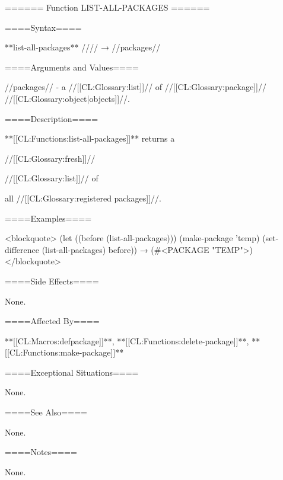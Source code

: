 ====== Function LIST-ALL-PACKAGES ======

====Syntax====

**list-all-packages** //\noargs// → //packages//

====Arguments and Values====

//packages// - a //[[CL:Glossary:list]]// of //[[CL:Glossary:package]]// //[[CL:Glossary:object|objects]]//.

====Description====

**[[CL:Functions:list-all-packages]]** returns a

//[[CL:Glossary:fresh]]//

//[[CL:Glossary:list]]// of

all //[[CL:Glossary:registered packages]]//.

====Examples====

<blockquote> (let ((before (list-all-packages))) (make-package 'temp) (set-difference (list-all-packages) before)) → (#<PACKAGE "TEMP">) </blockquote>

====Side Effects====

None.

====Affected By====

**[[CL:Macros:defpackage]]**, **[[CL:Functions:delete-package]]**, **[[CL:Functions:make-package]]**

====Exceptional Situations====

None.

====See Also====

None.

====Notes====

None.

 
